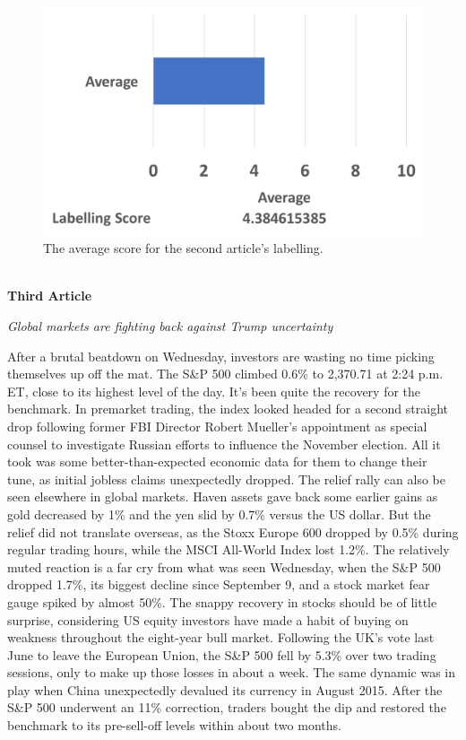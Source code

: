 \documentclass[12pt]{article}
\begin{document}
\begin{figure}[ht!]
  \centering
    \includegraphics[scale=0.6]{label2score.png}
   \caption[The average score for a labelling]{The average score for the second article's labelling.}
   \label{label2}
\end{figure} 

\textbf{\\ Third Article}

\begin{mdframed}

\emph{Global markets are fighting back against Trump uncertainty} \cite{trumparticle}

After a brutal beatdown on Wednesday, investors are wasting no time picking themselves up off the mat. The S\&P 500 climbed 0.6\% to 2,370.71 at 2:24 p.m. ET, close to its highest level of the day. It's been quite the recovery for the benchmark. In premarket trading, the index looked headed for a second straight drop following former FBI Director Robert Mueller's appointment as special counsel to investigate Russian efforts to influence the November election. All it took was some better-than-expected economic data for them to change their tune, as initial jobless claims unexpectedly dropped. The relief rally can also be seen elsewhere in global markets. Haven assets gave back some earlier gains as gold decreased by 1\% and the yen slid by 0.7\% versus the US dollar. But the relief did not translate overseas, as the Stoxx Europe 600 dropped by 0.5\% during regular trading hours, while the MSCI All-World Index lost 1.2\%. The relatively muted reaction is a far cry from what was seen Wednesday, when the S\&P 500 dropped 1.7\%, its biggest decline since September 9, and a stock market fear gauge spiked by almost 50\%. The snappy recovery in stocks should be of little surprise, considering US equity investors have made a habit of buying on weakness throughout the eight-year bull market. Following the UK's vote last June to leave the European Union, the S\&P 500 fell by 5.3\% over two trading sessions, only to make up those losses in about a week. The same dynamic was in play when China unexpectedly devalued its currency in August 2015. After the S\&P 500 underwent an 11\% correction, traders bought the dip and restored the benchmark to its pre-sell-off levels within about two months. \\

\end{mdframed}
\end{document}
